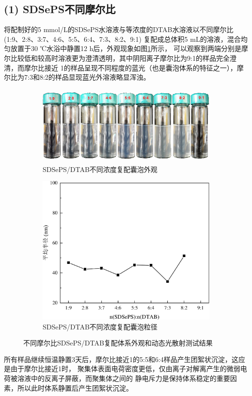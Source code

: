 \documentclass[bachelor,winfonts,replaceperiod]{jnuthesis}
\begin{document}
    \subsection*{(1) SDSePS不同摩尔比}
    将配制好的5 mmol/L的SDSePS水溶液与等浓度的DTAB水溶液以不同摩尔比 (1:9、2:8、3:7、4:6、5:5、6:4、7:3、8:2、9:1)
    复配成总体积5 mL的溶液，混合均匀放置于30 ℃水浴中静置12 h后，外观现象如图\ref{fig:SDSePS-DTAB-ratio}所示，
    可以观察到两端分别是摩尔比较低和较高时溶液更为澄清透明，其中阴阳离子摩尔比为9:1的样品完全澄清，而摩尔比接近
    1的样品呈现不同程度的蓝光（也是囊泡体系的特征之一），摩尔比为7:3和8:2的样品显现蓝光外溶液略显浑浊。
    \begin{figure}[htbp]
        \centering
        \begin{subfigure}[]{\textwidth}
            \centering
            \includegraphics[height=4cm]{figure/SDSePS-DTAB-ratio.png}
            \caption{SDSePS/DTAB不同浓度复配囊泡外观}\label{fig:SDSePS-DTAB-ratio}
        \end{subfigure}%
        
        \begin{subfigure}[]{\textwidth}
            \centering
            \includegraphics[width=.6\textwidth]{figure/SDSePS-DTAB-ratio-fig.pdf}
            \caption{SDSePS/DTAB不同浓度复配囊泡粒径}\label{fig:SDSePS-DTAB-ratio-fig}
        \end{subfigure}%
        \caption{不同摩尔比SDSePS/DTAB复配体系外观和动态光散射测试结果}
        \label{fig:不同摩尔比SDSePS/DTAB}
    \end{figure}
    所有样品继续恒温静置3天后，摩尔比接近1的5:5和6:4样品产生团絮状沉淀，这应是由于摩尔比接近1时，
    聚集体表面电荷密度更低，仅由离子对解离产生的微弱电荷被溶液中的反离子屏蔽，而聚集体之间的
    静电斥力是保持体系稳定的重要因素，所以此时体系静置后产生团絮状沉淀。
    
\end{document}
